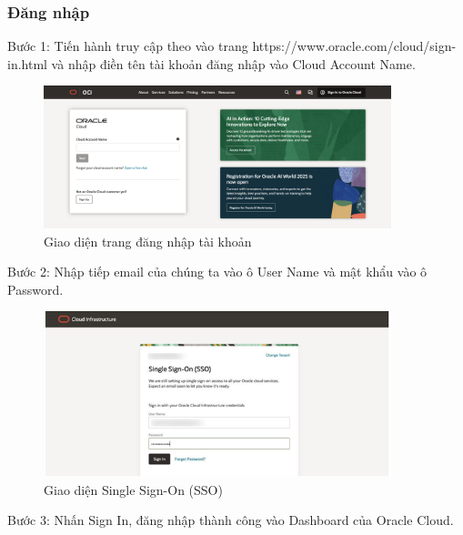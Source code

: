 \subsubsection{Đăng nhập}
\begin{myitem}
\item Bước 1: Tiến hành truy cập theo vào trang https://www.oracle.com/cloud/sign-in.html và nhập điền tên tài khoản đăng nhập vào Cloud Account Name.

\begin{figure}[H] %
    \centering
    \includegraphics[width=0.9\textwidth]{Demo/Trang_dang_nhap.png}
    \caption{Giao diện trang đăng nhập tài khoản}
    \label{fig:cloud_intro}
\end{figure}

\item Bước 2: Nhập tiếp email của chúng ta vào ô User Name và mật khẩu vào ô Password.

\begin{figure}[H] %
    \centering
    \includegraphics[width=0.9\textwidth]{Demo/Single_Sign_On.png}
    \caption{Giao diện Single Sign-On (SSO)}
    \label{fig:cloud_intro}
\end{figure}

\item Bước 3: Nhấn Sign In, đăng nhập thành công vào Dashboard của Oracle Cloud.


\end{myitem}
